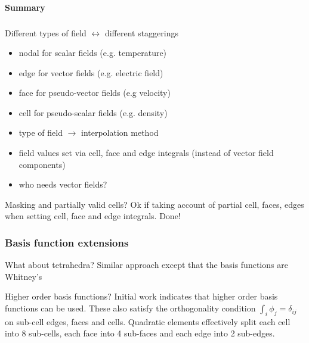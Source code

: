 \documentclass[aspectratio=169]{beamer}
\newcommand\BackgroundPicture[1]{%
\setbeamertemplate{background}{%
\parbox[c][\paperheight]{\paperwidth}{%
\vfill \hfill \texttt{[image: \#1]}
\hfill \vfill
}}}
\begin{document}
\BackgroundPicture{NeSI/divider-02.png}
\begin{frame}[fragile]{}
  \begin{center}
    \Huge{\textbf{Summary}}
  \end{center}
\end{frame}
\BackgroundPicture{NeSI/blank-01.png}

\begin{frame}[t]
  \frametitle{}
    \begin{block}{Different types of field $\leftrightarrow$ different staggerings}
      \begin{itemize}%
	  \item nodal for scalar fields (e.g. temperature)
	  \item edge for vector fields (e.g. electric field)
	  \item face for pseudo-vector fields (e.g velocity)
	  \item cell for pseudo-scalar fields (e.g. density)
	  \item type of field $\rightarrow$ interpolation method
      \item field values set via cell, face and edge integrals (instead of vector field components)
	  \item who needs vector fields?
    \end{itemize}
    \end{block}
    \begin{block}{Masking and partially valid cells?}
	 Ok if taking account of partial cell, faces, edges when setting cell, face and edge integrals. Done!
  \end{block}
\end{frame}

\begin{frame}[t]
  \frametitle{Basis function extensions}
    \begin{block}{What about tetrahedra?}
      Similar approach except that the basis functions are Whitney's
    \end{block}
    \begin{block}{Higher order basis functions?}
    Initial work indicates that higher order basis functions can be used. These also satisfy the orthogonality condition $\int_i \phi_j = \delta_{ij}$
    on sub-cell edges, faces and cells. Quadratic elements effectively 
     split each cell into 8 sub-cells, each face into 4 sub-faces and each edge into 2 sub-edges. 
  \end{block}
\end{frame}
\end{document}
